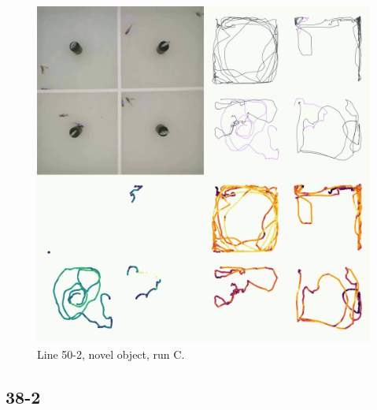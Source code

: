 \documentclass[
]{book}
\begin{document}
\begin{figure}
\includegraphics[width=1\linewidth]{figs/mikk_behaviour/four_panel_plots/novel_object_20191120_1150_50-2_R_C_300} \caption{Line 50-2, novel object, run C.}\label{fig:4p-50-2-no-C}
\end{figure}

\hypertarget{section-9}{%
\subsection{38-2}\label{section-9}}
\end{document}
